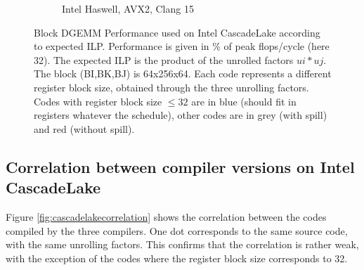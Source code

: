 \documentclass{article}
\begin{document}
\begin{figure}[h!]
\begin{subfigure}{0.45\textwidth}
  \caption{Intel Haswell, AVX2, Clang 15}
  \end{subfigure}
  \caption{Block DGEMM Performance used on Intel CascadeLake according to expected ILP. Performance is given in \% of peak flops/cycle (here 32). The expected ILP is the product of the unrolled factors $ui * uj$. The block (BI,BK,BJ) is 64x256x64. Each code represents a different register block size, obtained through the three unrolling factors. Codes with register block size $\leq 32$ are in blue (should fit in registers whatever the schedule), other codes are in grey (with spill) and red (without spill).\label{fig:cascadelakeilp}}
\end{figure}


\subsection{Correlation between compiler versions on Intel CascadeLake}

Figure \ref{fig:cascadelakecorrelation}  shows the correlation between the codes compiled by the three compilers. One dot corresponds to the same source code, with the same unrolling factors. This confirms that the correlation is rather weak, with the exception of the codes where the register block size corresponds to 32.  
\end{document}
